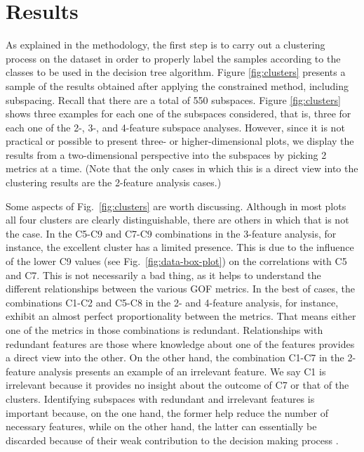 
\section{Results}
\label{sec:results}

As explained in the methodology, the first step is to carry out a clustering process on the dataset in order to properly label the samples according to the classes to be used in the decision tree algorithm. Figure \ref{fig:clusters} presents a sample of the results obtained after applying the constrained \kmeans{} method, including subspacing. Recall that there are a total of 550 subspaces. Figure \ref{fig:clusters} shows three examples for each one of the subspaces considered, that is, three for each one of the 2-, 3-, and 4-feature subspace analyses. However, since it is not practical or possible to present three- or higher-dimensional plots, we display the results from a two-dimensional perspective into the subspaces by picking 2 metrics at a time. (Note that the only cases in which this is a direct view into the clustering results are the 2-feature analysis cases.)

Some aspects of Fig.~\ref{fig:clusters} are worth discussing. Although in most plots all four clusters are clearly distinguishable, there are others in which that is not the case. In the C5-C9 and C7-C9 combinations in the 3-feature analysis, for instance, the excellent cluster has a limited presence. This is due to the influence of the lower C9 values (see Fig.~\ref{fig:data-box-plot}) on the correlations with C5 and C7. This is not necessarily a bad thing, as it helps to understand the different relationships between the various GOF metrics. In the best of cases, the combinations C1-C2 and C5-C8 in the 2- and 4-feature analysis, for instance, exhibit an almost perfect proportionality between the metrics. That means either one of the metrics in those combinations is redundant. Relationships with redundant features are those where knowledge about one of the features provides a direct view into the other. On the other hand, the combination C1-C7 in the 2-feature analysis presents an example of an irrelevant feature. We say C1 is irrelevant because it provides no insight about the outcome of C7 or that of the clusters. Identifying subspaces with redundant and irrelevant features is important because, on the one hand, the former help reduce the number of necessary features, while on the other hand, the latter can essentially be discarded because of their weak contribution to the decision making process \citep{Dy_2004_MLR}.

